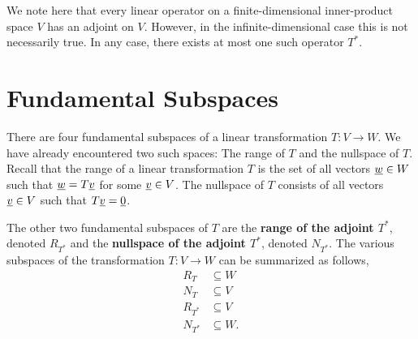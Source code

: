We note here that every linear operator on a finite-dimensional inner-product space $V$ has an adjoint on $V$.
However, in the infinite-dimensional case this is not necessarily true.
In any case, there exists at most one such operator $T^*$.


\section{Fundamental Subspaces}

There are four fundamental subspaces of a linear transformation $T : V \rightarrow W$.
We have already encountered two such spaces: The range of $T$ and the nullspace of $T$.
Recall that the range of a linear transformation $T$ is the set of all vectors $\underline{w} \in W$ such that $\underline{w} = T \underline{v}$ for some $\underline{v} \in V$.
The nullspace of $T$ consists of all vectors $\underline{v} \in V$ such that $T \underline{v} = \underline{0}$.

The other two fundamental subspaces of $T$ are the \textbf{range of the adjoint $T^*$}, denoted $R_{T^*}$ and the \textbf{nullspace of the adjoint $T^*$}, denoted $N_{T^*}$.
The various subspaces of the transformation $T : V \rightarrow W$ can be summarized as follows,
\begin{align*}
R_T &\subseteq W \\
N_T &\subseteq V \\
R_{T^*} &\subseteq V \\
N_{T^*} &\subseteq W .
\end{align*}

